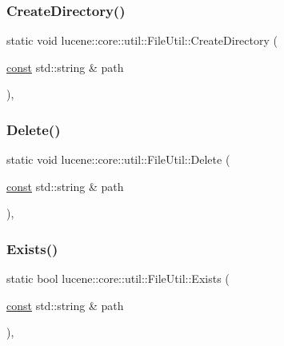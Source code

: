 \subsubsection{\texorpdfstring{Create\+Directory()}{CreateDirectory()}}
{\footnotesize\ttfamily static void lucene\+::core\+::util\+::\+File\+Util\+::\+Create\+Directory (\begin{DoxyParamCaption}\item[{\mbox{\hyperlink{ZlibCrc32_8h_a2c212835823e3c54a8ab6d95c652660e}{const}} std\+::string \&}]{path }\end{DoxyParamCaption})\hspace{0.3cm}{\ttfamily [inline]}, {\ttfamily [static]}}

\mbox{\label{classlucene_1_1core_1_1util_1_1FileUtil_a060865ee48abca5c98dd073040ed95d4}} 
\subsubsection{\texorpdfstring{Delete()}{Delete()}}
{\footnotesize\ttfamily static void lucene\+::core\+::util\+::\+File\+Util\+::\+Delete (\begin{DoxyParamCaption}\item[{\mbox{\hyperlink{ZlibCrc32_8h_a2c212835823e3c54a8ab6d95c652660e}{const}} std\+::string \&}]{path }\end{DoxyParamCaption})\hspace{0.3cm}{\ttfamily [inline]}, {\ttfamily [static]}}

\mbox{\label{classlucene_1_1core_1_1util_1_1FileUtil_a486cd10f84cdf1919b99ca8b80d67a40}} 
\subsubsection{\texorpdfstring{Exists()}{Exists()}}
{\footnotesize\ttfamily static bool lucene\+::core\+::util\+::\+File\+Util\+::\+Exists (\begin{DoxyParamCaption}\item[{\mbox{\hyperlink{ZlibCrc32_8h_a2c212835823e3c54a8ab6d95c652660e}{const}} std\+::string \&}]{path }\end{DoxyParamCaption})\hspace{0.3cm}{\ttfamily [inline]}, {\ttfamily [static]}}

